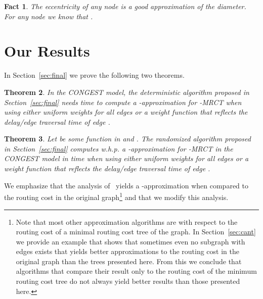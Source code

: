 \documentclass[11pt]{article}
\newtheorem{theorem}{Theorem}[section]
\newtheorem{fact}[theorem]{Fact}
\begin{document}
\begin{fact}\label{fact:ecc-approx-diam}
The eccentricity of any node is a good approximation of the diameter. For any node  we know that .
\end{fact}

\section{Our Results}\label{sec:results}
In Section~\ref{sec:final} we prove the following two theorems.
\begin{theorem}\label{thm:mrct}
In the CONGEST model, the deterministic algorithm proposed in Section~\ref{sec:final} needs time  to compute a -approximation for -MRCT when using either uniform weights for all edges or a weight function  that reflects the delay/edge traversal time of edge .
\end{theorem} 


\begin{theorem}\label{thm:mrct-rand}
Let  be some function in  and . The randomized algorithm proposed in Section~\ref{sec:final} computes w.h.p. a 
-approximation for -MRCT in the CONGEST model in time  when using either uniform weights for all edges or a weight function  that reflects the delay/edge traversal time of edge .
\end{theorem} 



We emphasize that the analysis of~\cite{wong1980worst} yields a -approximation when compared to the routing cost in the original graph\footnote{Note that most other approximation algorithms are with respect to  the routing cost of a minimal routing cost tree of the graph. In Section~\ref{sec:cant} we provide an example that shows that sometimes even no subgraph with  edges exists that yields better approximations to the routing cost in the original graph than the trees presented here. From this we conclude that algorithms that compare their result only to the routing cost of the minimum routing cost tree do not always yield better results than those presented here.} and that we modify this analysis.
\end{document}
